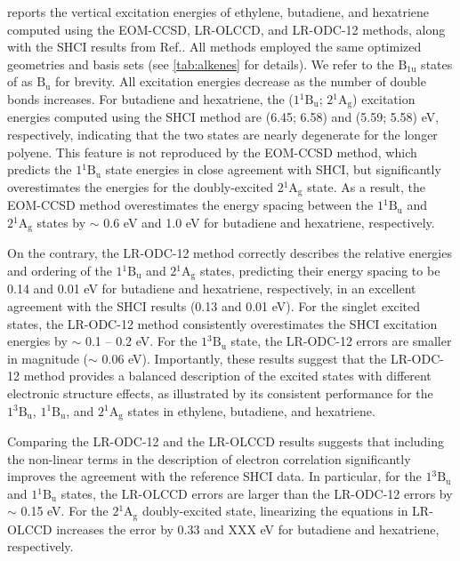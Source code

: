  reports the vertical excitation energies of ethylene,
butadiene, and hexatriene computed using the EOM-CCSD, LR-OLCCD, and LR-ODC-12
methods, along with the SHCI results from Ref.\@ {}.
All methods employed the same optimized geometries and basis sets (see
\cref{tab:alkenes} for details).
We refer to the $\mathrm{B_{1u}}$ states of  as $\mathrm{B_{u}}$ for
brevity.
All excitation energies decrease as the number of double bonds increases.
For butadiene and hexatriene, the ($1{}^1\mathrm{B_{u}}$; $2{}^1\mathrm{A_{g}}$)
excitation energies computed using the SHCI method are (6.45; 6.58) and (5.59;
5.58) eV, respectively, indicating that the two states are nearly degenerate for
the longer polyene.
This feature is not reproduced by the EOM-CCSD method, which predicts the
$1{}^1\mathrm{B_{u}}$ state energies in close agreement with SHCI, but
significantly overestimates the energies for the doubly-excited
$2{}^1\mathrm{A_{g}}$ state.
As a result, the EOM-CCSD method overestimates the energy spacing between the
$1{}^1\mathrm{B_{u}}$ and $2{}^1\mathrm{A_{g}}$ states by $\sim$ 0.6 eV and 1.0
eV for butadiene and hexatriene, respectively. 

On the contrary, the LR-ODC-12 method correctly describes the relative energies
and ordering of the $1{}^1\mathrm{B_{u}}$ and $2{}^1\mathrm{A_{g}}$ states,
predicting their energy spacing to be 0.14 and 0.01 eV for butadiene and
hexatriene, respectively, in an excellent agreement with the SHCI results (0.13
and 0.01 eV).
For the singlet excited states, the LR-ODC-12 method consistently overestimates
the SHCI excitation energies by $\sim$ 0.1 -- 0.2 eV.
For the $1{}^3\mathrm{B_{u}}$ state, the LR-ODC-12 errors are smaller in
magnitude ($\sim$ 0.06 eV).
Importantly, these results suggest that the LR-ODC-12 method provides a balanced
description of the excited states with different electronic structure effects,
as illustrated by its consistent performance for the $1{}^3\mathrm{B_{u}}$,
$1{}^1\mathrm{B_{u}}$, and $2{}^1\mathrm{A_{g}}$ states in ethylene, butadiene,
and hexatriene.

Comparing the LR-ODC-12 and the LR-OLCCD results suggests that including the
non-linear terms in the description of electron correlation significantly
improves the agreement with the reference SHCI data.
In particular, for the $1{}^3\mathrm{B_{u}}$ and $1{}^1\mathrm{B_{u}}$ states,
the LR-OLCCD errors are larger than the LR-ODC-12 errors by $\sim$ 0.15 eV.
For the $2{}^1\mathrm{A_{g}}$ doubly-excited state, linearizing the equations in
LR-OLCCD increases the error by 0.33 and {\color{red} XXX} eV for butadiene and
hexatriene, respectively. 

